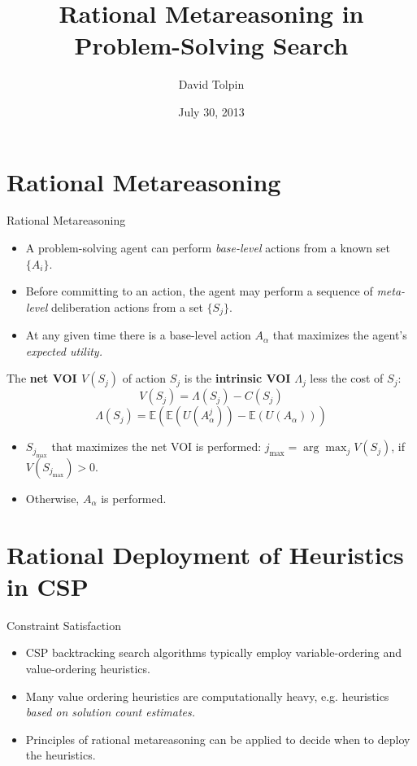 \documentclass{beamer}
\title{Rational Metareasoning in Problem-Solving Search}
\author{David Tolpin}
\institute{Ben-Gurion University of the Negev\\Beer Sheva, Israel}
\date{July 30, 2013}
\begin{document}
\begin{frame}
\titlepage
\end{frame}

\begin{frame}
\tableofcontents
\end{frame}

\section{Rational Metareasoning}

\begin{frame}{Rational Metareasoning}
\begin{itemize}
\item A problem-solving agent can perform {\it base-level} actions from a known
          set $\{A_i\}$.
\item Before committing to an action, the agent may perform a sequence of
          {\it meta-level} deliberation actions from a set $\{S_j\}$.
\item At any given time there is a base-level action $A_\alpha$ that maximizes
          the agent's {\it expected utility.}
\end{itemize}

          The {\bf net VOI $V(S_j)$} of action $S_j$ is the {\bf intrinsic VOI} $\Lambda_j$ less the cost of $S_j$:
          \[V(S_j)=\Lambda(S_j)-C(S_j)\]
           \[\Lambda(S_j)=\mathbb{E}\left(\mathbb{E}(U(A_\alpha^j))-\mathbb{E}(U(A_\alpha))\right)\]

\begin{itemize} 
\item  $S_{j_{\max}}$ that maximizes the net VOI  is performed: $j_{\max} = \arg\max_jV(S_j)$, if $V(S_{j_{\max}})>0$.
\item Otherwise, $A_\alpha$ is performed.
\end{itemize}
\end{frame}


\section{Rational Deployment of Heuristics in CSP}

\begin{frame}{Constraint Satisfaction}
\begin{itemize}
\item CSP backtracking search algorithms typically employ
  variable-ordering and value-ordering heuristics.
\item Many value ordering heuristics are computationally
  heavy, e.g. heuristics {\it based on solution count
          estimates.}
\item Principles of rational metareasoning can be applied
          to decide when to deploy the heuristics.
\end{itemize}
\end{frame}
\end{document}
